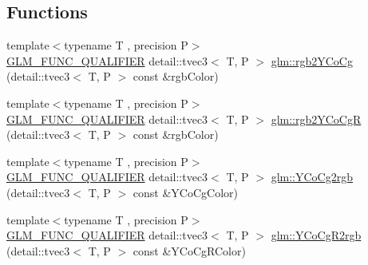 \subsection*{Functions}
\begin{DoxyCompactItemize}
\item 
{\footnotesize template$<$typename T , precision P$>$ }\\\hyperlink{setup_8hpp_a33fdea6f91c5f834105f7415e2a64407}{G\+L\+M\+\_\+\+F\+U\+N\+C\+\_\+\+Q\+U\+A\+L\+I\+F\+I\+ER} detail\+::tvec3$<$ T, P $>$ \hyperlink{group__gtx__color__space___y_co_cg_ga2a235b86e67866fd9fef640bcc47c93d}{glm\+::rgb2\+Y\+Co\+Cg} (detail\+::tvec3$<$ T, P $>$ const \&rgb\+Color)
\item 
{\footnotesize template$<$typename T , precision P$>$ }\\\hyperlink{setup_8hpp_a33fdea6f91c5f834105f7415e2a64407}{G\+L\+M\+\_\+\+F\+U\+N\+C\+\_\+\+Q\+U\+A\+L\+I\+F\+I\+ER} detail\+::tvec3$<$ T, P $>$ \hyperlink{group__gtx__color__space___y_co_cg_gaeee43c2a06fe63d46a96cee4d1c63ce6}{glm\+::rgb2\+Y\+Co\+CgR} (detail\+::tvec3$<$ T, P $>$ const \&rgb\+Color)
\item 
{\footnotesize template$<$typename T , precision P$>$ }\\\hyperlink{setup_8hpp_a33fdea6f91c5f834105f7415e2a64407}{G\+L\+M\+\_\+\+F\+U\+N\+C\+\_\+\+Q\+U\+A\+L\+I\+F\+I\+ER} detail\+::tvec3$<$ T, P $>$ \hyperlink{group__gtx__color__space___y_co_cg_gab40e31e352d2d318d3f062df2882c500}{glm\+::\+Y\+Co\+Cg2rgb} (detail\+::tvec3$<$ T, P $>$ const \&Y\+Co\+Cg\+Color)
\item 
{\footnotesize template$<$typename T , precision P$>$ }\\\hyperlink{setup_8hpp_a33fdea6f91c5f834105f7415e2a64407}{G\+L\+M\+\_\+\+F\+U\+N\+C\+\_\+\+Q\+U\+A\+L\+I\+F\+I\+ER} detail\+::tvec3$<$ T, P $>$ \hyperlink{group__gtx__color__space___y_co_cg_ga7b90b9b5758dbe96a82a2ef8237a17e9}{glm\+::\+Y\+Co\+Cg\+R2rgb} (detail\+::tvec3$<$ T, P $>$ const \&Y\+Co\+Cg\+R\+Color)
\end{DoxyCompactItemize}
